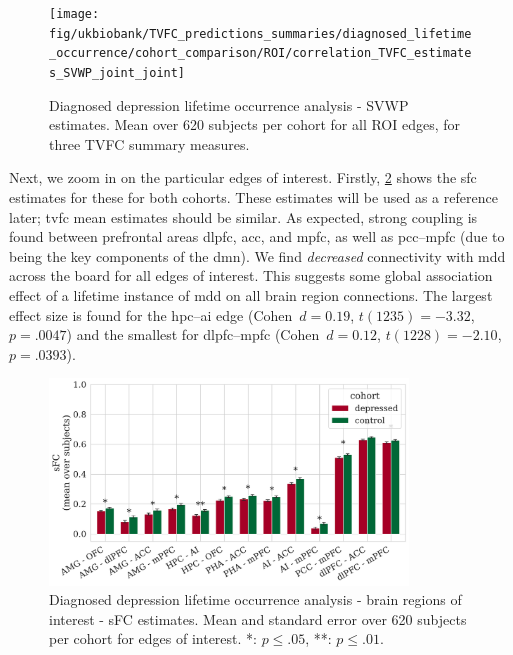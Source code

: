 \begin{figure}[ht]
  \centering
  \texttt{[image: fig/ukbiobank/TVFC\_predictions\_summaries/diagnosed\_lifetime\_occurrence/cohort\_comparison/ROI/correlation\_TVFC\_estimates\_SVWP\_joint\_joint]}
  \caption{
    Diagnosed depression lifetime occurrence analysis - SVWP estimates.
    Mean over 620 subjects per cohort for all ROI edges, for three TVFC summary measures.
  }\label{fig:ukb-results-dlo-roi-cohort-comparison-full-wp}
\end{figure}


Next, we zoom in on the particular edges of interest.
Firstly, \cref{fig:ukb-results-dlo-roi-cohort-comparison-edges-of-interest-sfc} shows the \gls{sfc} estimates for these for both cohorts.
These estimates will be used as a reference later; \gls{tvfc} mean estimates should be similar.
As expected, strong coupling is found between prefrontal areas \gls{dlpfc}, \gls{acc}, and \gls{mpfc}, as well as \gls{pcc}--\gls{mpfc} (due to being the key components of the \gls{dmn}).
%
We find \emph{decreased} connectivity with \gls{mdd} across the board for all edges of interest.
This suggests some global association effect of a lifetime instance of \gls{mdd} on all brain region connections.
The largest effect size is found for the \gls{hpc}--\gls{ai} edge (Cohen~$d = 0.19$, $t(1235) = -3.32$, $p = .0047$) and the smallest for \gls{dlpfc}--\gls{mpfc} (Cohen~$d = 0.12$, $t(1228) = -2.10$, $p = .0393$).


\begin{figure}[t]
  \centering
  \includegraphics[width=0.85\textwidth]{fig/ukbiobank/TVFC_predictions_summaries/diagnosed_lifetime_occurrence/cohort_comparison/ROI/correlation_TVFC_mean_sFC_edges_of_interest}
  \caption{
    Diagnosed depression lifetime occurrence analysis - brain regions of interest - sFC estimates.
    Mean and standard error over 620 subjects per cohort for edges of interest.
    *: $p \leq .05$, **: $p \leq .01$.
  }\label{fig:ukb-results-dlo-roi-cohort-comparison-edges-of-interest-sfc}
\end{figure}


